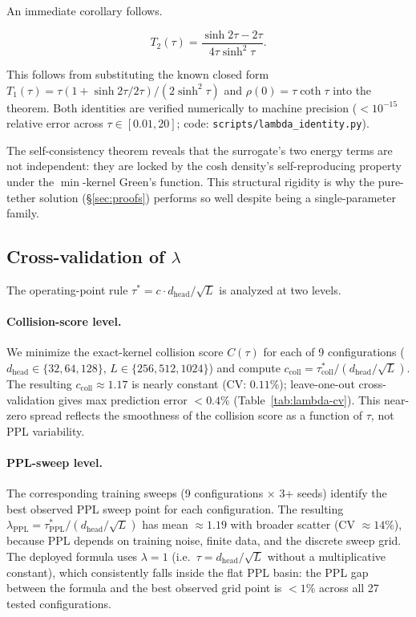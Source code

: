 An immediate corollary follows.

\begin{corollary}
\begin{equation}
T_2(\tau) = \frac{\sinh 2\tau - 2\tau}{4\tau\sinh^2\tau}.
\end{equation}
\end{corollary}

This follows from substituting the known closed form $T_1(\tau) = \tau(1 + \sinh 2\tau / 2\tau) / (2\sinh^2\tau)$ and $\rho(0) = \tau\coth\tau$ into the theorem. Both identities are verified numerically to machine precision ($<10^{-15}$ relative error across $\tau \in [0.01, 20]$; code: \texttt{scripts/lambda\_identity.py}).

The self-consistency theorem reveals that the surrogate's two energy terms are not independent: they are locked by the cosh density's self-reproducing property under the $\min$-kernel Green's function. This structural rigidity is why the pure-tether solution (\S\ref{sec:proofs}) performs so well despite being a single-parameter family.

\subsection{Cross-validation of \texorpdfstring{$\lambda$}{lambda}}
\label{sec:lambda-cv}

The operating-point rule $\tau^* = c\cdot d_{\mathrm{head}}/\sqrt{L}$ is analyzed at two levels.

\paragraph{Collision-score level.} We minimize the exact-kernel collision score $C(\tau)$ for each of 9 configurations ($d_{\mathrm{head}} \in \{32, 64, 128\}$, $L \in \{256, 512, 1024\}$) and compute $c_{\mathrm{coll}} = \tau^*_{\mathrm{coll}} / (d_{\mathrm{head}}/\sqrt{L})$. The resulting $c_{\mathrm{coll}} \approx 1.17$ is nearly constant (CV: $0.11\%$); leave-one-out cross-validation gives max prediction error $<0.4\%$ (Table~\ref{tab:lambda-cv}). This near-zero spread reflects the smoothness of the collision score as a function of $\tau$, not PPL variability.



\paragraph{PPL-sweep level.} The corresponding training sweeps (9 configurations $\times$ 3+ seeds) identify the best observed PPL sweep point for each configuration. The resulting $\lambda_{\mathrm{PPL}} = \tau^*_{\mathrm{PPL}} / (d_{\mathrm{head}}/\sqrt{L})$ has mean ${\approx}1.19$ with broader scatter (CV ${\approx}14\%$), because PPL depends on training noise, finite data, and the discrete sweep grid. The deployed formula uses $\lambda{=}1$ (i.e.\ $\tau = d_{\mathrm{head}}/\sqrt{L}$ without a multiplicative constant), which consistently falls inside the flat PPL basin: the PPL gap between the formula and the best observed grid point is ${<}1\%$ across all 27 tested configurations.

